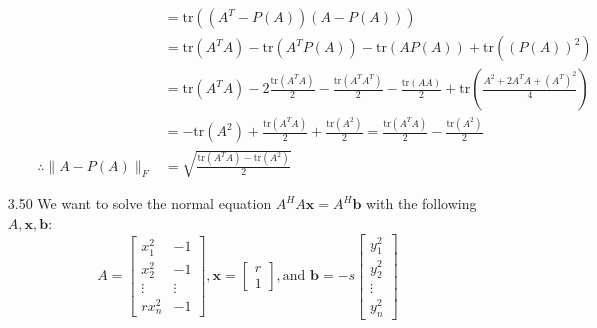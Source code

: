 \documentclass[letterpaper,12pt]{article}
\theoremstyle{definition}
\begin{document}
\begin{enumerate}
\begin{enumerate}
\begin{align*}
                &= \text{tr}((A^T-P(A))(A-P(A))) \\
                &= \text{tr}(A^TA) - \text{tr}(A^TP(A)) - \text{tr}(AP(A)) + \text{tr}((P(A))^2) \\
                &= \text{tr}(A^TA) - 2\frac{\text{tr}(A^TA)}{2} - \frac{\text{tr}(A^TA^T)}{2} - \frac{\text{tr}(AA)}{2} + \text{tr}(\frac{A^2 + 2A^TA + (A^T)^2}{4}) \\
                &= -\text{tr}(A^2) + \frac{\text{tr}(A^TA)}{2} + \frac{\text{tr}(A^2)}{2} = \frac{\text{tr}(A^TA)}{2} - \frac{\text{tr}(A^2)}{2} \\
                \therefore \|A-P(A)\|_F &= \sqrt{\frac{\text{tr}(A^TA) - \text{tr}(A^2)}{2}}
              \end{align*}
          \end{enumerate}

        \item[3.50]
        We want to solve the normal equation $A^HA\mathbf{x} = A^H\mathbf{b}$ with the following $A, \mathbf{x}, \mathbf{b}$:
        \[
          A=
          \begin{bmatrix}
            x_1^2 & -1 \\
            x_2^2 & -1 \\
            \vdots & \vdots \\
            rx_n^2 & -1
          \end{bmatrix}
          ,
          \mathbf{x}=
          \begin{bmatrix}
            r \\
            1
          \end{bmatrix}
          , \text{and }
          \mathbf{b}= -s
          \begin{bmatrix}
            y_1^2 \\
            y_2^2 \\
            \vdots \\
            y_n^2
          \end{bmatrix}
        \]

\end{enumerate}
\end{document}
